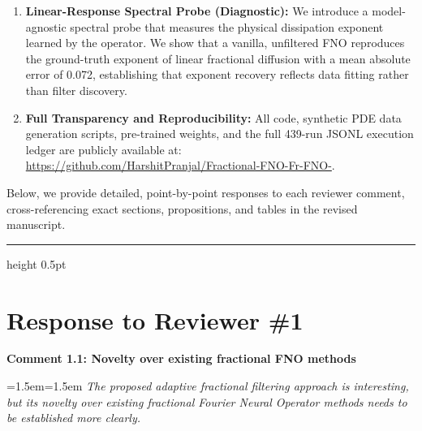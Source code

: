\documentclass[11pt,a4paper]{article}
\newcommand{\revcomment}[2]{%
  \vspace{3mm}\par\noindent
  \textbf{\color{navyblue}#1}\par\vspace{1.5mm}
  \begingroup
  \leftskip=1.5em\rightskip=1.5em
  \small\itshape\color{commentgray}
  #2\par
  \endgroup
  \vspace{2mm}
}
\begin{document}
\begin{enumerate}
  \item \textbf{Linear-Response Spectral Probe (Diagnostic):} We introduce a model-agnostic spectral probe that measures the physical dissipation exponent learned by the operator. We show that a vanilla, unfiltered FNO reproduces the ground-truth exponent of linear fractional diffusion with a mean absolute error of 0.072, establishing that exponent recovery reflects data fitting rather than filter discovery.
  \item \textbf{Full Transparency and Reproducibility:} All code, synthetic PDE data generation scripts, pre-trained weights, and the full 439-run JSONL execution ledger are publicly available at: \url{https://github.com/HarshitPranjal/Fractional-FNO-Fr-FNO-}.
\end{enumerate}

Below, we provide detailed, point-by-point responses to each reviewer comment, cross-referencing exact sections, propositions, and tables in the revised manuscript.

\vspace{3mm}
\hrule height 0.5pt
\vspace{3mm}

\section*{Response to Reviewer \#1}

\revcomment{Comment 1.1: Novelty over existing fractional FNO methods}{The proposed adaptive fractional filtering approach is interesting, but its novelty over existing fractional Fourier Neural Operator methods needs to be established more clearly.}
\end{document}
